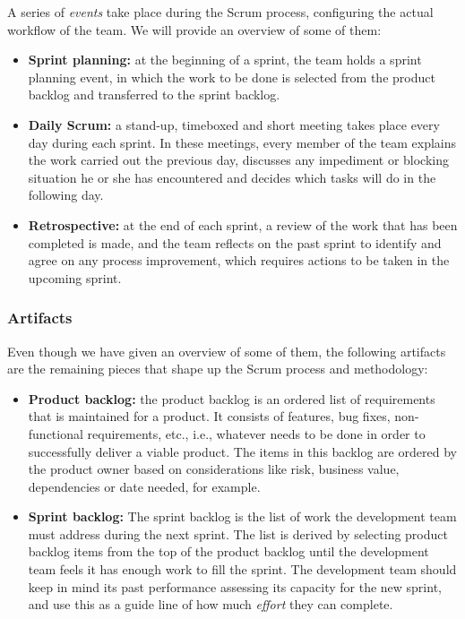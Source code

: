 A series of \textit{events} take place during the Scrum process, configuring the actual workflow of the team. We will provide an overview of some of them:

\begin{itemize}
	\item
	\textbf{Sprint planning:} at the beginning of a sprint, the team holds a sprint planning event, in which the work to be done is selected from the product backlog and transferred to the sprint backlog.
	
	\item
	\textbf{Daily Scrum:} a stand-up, timeboxed and short meeting takes place every day during each sprint. In these meetings, every member of the team explains the work carried out the previous day, discusses any impediment or blocking situation he or she has encountered and decides which tasks will do in the following day.
	
	\item
	\textbf{Retrospective:} at the end of each sprint, a review of the work that has been completed is made, and the team reflects on the past sprint to identify and agree on any process improvement, which requires actions to be taken in the upcoming sprint.
\end{itemize}

\subsubsection*{Artifacts}

Even though we have given an overview of some of them, the following artifacts are the remaining pieces that shape up the Scrum process and methodology:

\begin{itemize}
	\item
	\textbf{Product backlog:} the product backlog is an ordered list of requirements that is maintained for a product. It consists of features, bug fixes, non-functional requirements, etc., i.e., whatever needs to be done in order to successfully deliver a viable product. The items in this backlog are ordered by the product owner based on considerations like risk, business value, dependencies or date needed, for example.
	
	\item
	\textbf{Sprint backlog:} The sprint backlog is the list of work the development team must address during the next sprint. The list is derived by selecting product backlog items from the top of the product backlog until the development team feels it has enough work to fill the sprint. The development team should keep in mind its past performance assessing its capacity for the new sprint, and use this as a guide line of how much \textit{effort} they can complete.
\end{itemize}

